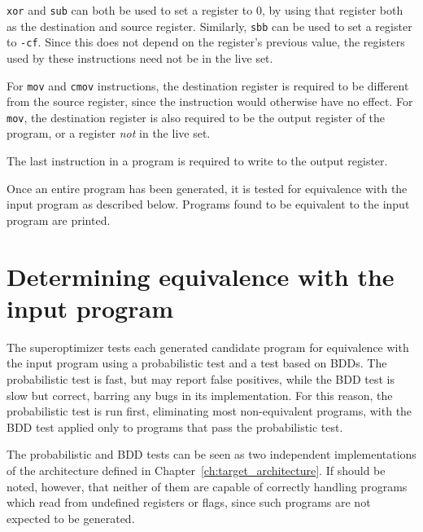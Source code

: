 \documentclass[a4paper,11pt]{kth-mag}
\begin{document}

\verb|xor| and \verb|sub| can both be used to set a register to 0, by using that register both as the destination and source register.
Similarly, \verb|sbb| can be used to set a register to \verb|-cf|.
Since this does not depend on the register's previous value, the registers used by these instructions need not be in the live set.

For \verb|mov| and \verb|cmov| instructions, the destination register is required to be different from the source register, since the instruction would otherwise have no effect.
For \verb|mov|, the destination register is also required to be the output register of the program, or a register \emph{not} in the live set.

The last instruction in a program is required to write to the output register.

Once an entire program has been generated, it is tested for equivalence with the input program as described below.
Programs found to be equivalent to the input program are printed.


\section{Determining equivalence with the input program}


The superoptimizer tests each generated candidate program for equivalence with the input program using a probabilistic test and a test based on BDDs.
The probabilistic test is fast, but may report false positives, while the BDD test is slow but correct, barring any bugs in its implementation.
For this reason, the probabilistic test is run first, eliminating most non-equivalent programs, with the BDD test applied only to programs that pass the probabilistic test.

The probabilistic and BDD tests can be seen as two independent implementations of the architecture defined in Chapter~\ref{ch:target_architecture}.
If should be noted, however, that neither of them are capable of correctly handling programs which read from undefined registers or flags, since such programs are not expected to be generated.
\end{document}

